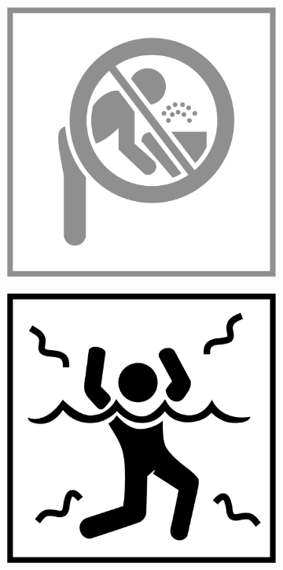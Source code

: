\begin{figure}[H]
\begin{subfigure}[l]{0.195\linewidth}
  \end{subfigure}
  \begin{subfigure}[l]{0.195\linewidth}
    \includegraphics[width=\textwidth]{Sources/PortalIcons/d8.jpg}
  \end{subfigure}
  \begin{subfigure}[l]{0.195\linewidth}
    \includegraphics[width=\textwidth]{Sources/PortalIcons/9.jpg}

\end{subfigure}
\end{figure}
